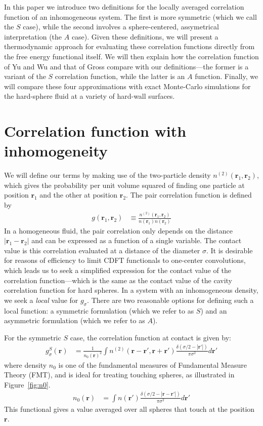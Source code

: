 \documentclass[letterpaper,twocolumn,amsmath,amssymb,jcp,10pt,aip]{revtex4-1}
\newcommand{\rr}{\textbf{r}}
\begin{document}
In this paper we introduce two definitions for the locally averaged
correlation function of an inhomogeneous system.  The first is more
symmetric (which we call the $S$ case), while the second involves a
sphere-centered, assymetrical interpretation (the $A$ case).  Given
these definitions, we will present a thermodynamic approach for
evaluating these correlation functions directly from the free
energy functional itself.  We will then explain how the correlation
function of Yu and Wu and that of Gross compare with our
definitions---the former is a variant of the $S$ correlation function,
while the latter is an $A$ function.  Finally, we will compare these
four approximations with exact Monte-Carlo simulations for the
hard-sphere fluid at a variety of hard-wall surfaces.


\section{Correlation function with inhomogeneity}

We will define our terms by making use of the two-particle density
$n^{(2)}(\rr_1,\rr_2)$, which gives the probability per unit volume
squared of finding one particle at position $\rr_1$ and the other at
position $\rr_2$.  The pair correlation function is defined by
\begin{align}
  g(\rr_1,\rr_2) &\equiv \frac{n^{(2)}(\rr_1,\rr_2)}{n(\rr_1)n(\rr_2)}
\end{align}
In a homogeneous fluid, the pair correlation only depends on the
distance $|\rr_1-\rr_2|$ and can be expressed as a function of a
single variable. The contact value is this correlation evaluated at a distance of the
diameter $\sigma$.  It is desirable for reasons of efficiency to limit CDFT
functionals to one-center convolutions, which leads us to seek a
simplified expression for the contact value of the correlation
function---which is the same as the contact value of the cavity
correlation function for hard spheres.
In a system with an inhomogeneous density, we seek a \emph{local}
value for $g_\sigma$.  There are two reasonable options for defining
such a local function: a symmetric formulation (which we refer to as $S$) and an
asymmetric formulation (which we refer to as $A$).

For the symmetric $S$ case, the correlation function at contact is
given by:
\begin{align}
  g^S_\sigma(\rr) &= \frac{1}{n_0(\rr)^2}\int n^{(2)}(\rr - \rr', \rr
  + \rr')
  \frac{\delta(\sigma/2 -|\rr'|)}{\pi\sigma^2}d\rr' \label{eq:gS}
\end{align}
where density $n_0$ is one of the fundamental measures of Fundamental
Measure Theory (FMT), and is ideal for treating touching spheres, as
illustrated in Figure~\ref{fig:n0}.
\begin{align}
  n_0(\rr) &= \int n(\rr')\frac{\delta(\sigma/2 -|\rr-\rr'|)}{\pi\sigma^2} d\rr'
\end{align}
This functional gives a value averaged over all spheres that touch at
the position $\rr$.
\end{document}
